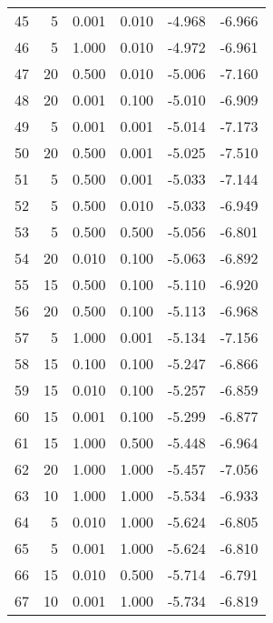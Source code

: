 \begin{tabular}{rrrrrr}
    45 &         5 &  0.001 & 0.010 &                 -4.968 &      -6.966 \\
    46 &         5 &  1.000 & 0.010 &                 -4.972 &      -6.961 \\
    47 &        20 &  0.500 & 0.010 &                 -5.006 &      -7.160 \\
    48 &        20 &  0.001 & 0.100 &                 -5.010 &      -6.909 \\
    49 &         5 &  0.001 & 0.001 &                 -5.014 &      -7.173 \\
    50 &        20 &  0.500 & 0.001 &                 -5.025 &      -7.510 \\
    51 &         5 &  0.500 & 0.001 &                 -5.033 &      -7.144 \\
    52 &         5 &  0.500 & 0.010 &                 -5.033 &      -6.949 \\
    53 &         5 &  0.500 & 0.500 &                 -5.056 &      -6.801 \\
    54 &        20 &  0.010 & 0.100 &                 -5.063 &      -6.892 \\
    55 &        15 &  0.500 & 0.100 &                 -5.110 &      -6.920 \\
    56 &        20 &  0.500 & 0.100 &                 -5.113 &      -6.968 \\
    57 &         5 &  1.000 & 0.001 &                 -5.134 &      -7.156 \\
    58 &        15 &  0.100 & 0.100 &                 -5.247 &      -6.866 \\
    59 &        15 &  0.010 & 0.100 &                 -5.257 &      -6.859 \\
    60 &        15 &  0.001 & 0.100 &                 -5.299 &      -6.877 \\
    61 &        15 &  1.000 & 0.500 &                 -5.448 &      -6.964 \\
    62 &        20 &  1.000 & 1.000 &                 -5.457 &      -7.056 \\
    63 &        10 &  1.000 & 1.000 &                 -5.534 &      -6.933 \\
    64 &         5 &  0.010 & 1.000 &                 -5.624 &      -6.805 \\
    65 &         5 &  0.001 & 1.000 &                 -5.624 &      -6.810 \\
    66 &        15 &  0.010 & 0.500 &                 -5.714 &      -6.791 \\
    67 &        10 &  0.001 & 1.000 &                 -5.734 &      -6.819 \\

\end{tabular}
